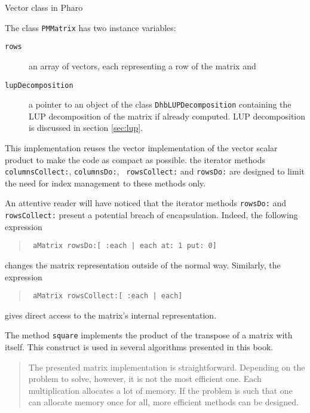 \documentclass[twoside]{book}
\begin{document}
\begin{listing} Vector class in Pharo \label{ls:vector}

\end{listing}

\noindent The class {\tt PMMatrix} has two instance variables:
\begin{description}
\item[\tt rows] an array of vectors, each representing a
row of the matrix and
\item[\tt lupDecomposition ] a pointer to an object of the class
{\tt DhbLUPDecomposition} containing the LUP decomposition of the
matrix if already computed. LUP decomposition is discussed in
section \ref{sec:lup}.
\end{description}
This implementation reuses the vector implementation of the vector
scalar product to make the code as compact as possible. the
iterator methods {\tt columnsCollect:}, {\tt columnsDo:}, {\tt
rowsCollect:} and {\tt rowsDo:} are designed to limit the need for
index management to these methods only.

An attentive reader will have noticed that the iterator methods
{\tt rowsDo:} and {\tt rowsCollect:} present a potential breach of
encapsulation. Indeed, the following expression
\begin{quote}
\begin{verbatim}
 aMatrix rowsDo:[ :each | each at: 1 put: 0]
\end{verbatim}
\end{quote}
changes the matrix representation outside of the normal way.
Similarly, the expression
\begin{quote}
\begin{verbatim}
 aMatrix rowsCollect:[ :each | each]
\end{verbatim}
\end{quote}
gives direct access to the matrix's internal representation.

The method {\tt square} implements the product of the transpose of
a matrix with itself. This construct is used in several algorithms
presented in this book.

\begin{quotation}
 The presented matrix implementation is
straightforward. Depending on the problem to solve, however, it is
not the most efficient one. Each multiplication allocates a lot of
memory. If the problem is such that one can allocate memory once
for all, more efficient methods can be designed.
\end{quotation}
\end{document}
